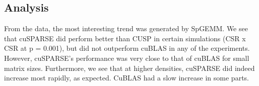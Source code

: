 \documentclass[12pt]{article}
\begin{document}

\subsection{Analysis}
\hspace{0.5cm}From the data, the most interesting trend was generated by SpGEMM. We see that cuSPARSE did perform better than CUSP in certain simulations (CSR x CSR at p = 0.001), but did not outperform cuBLAS in any of the experiments. However, cuSPARSE's performance was very close to that of cuBLAS for small matrix sizes. Furthermore, we see that at higher densities, cuSPARSE did indeed increase most rapidly, as expected. CuBLAS had a slow increase in some parts. 
\end{document}
